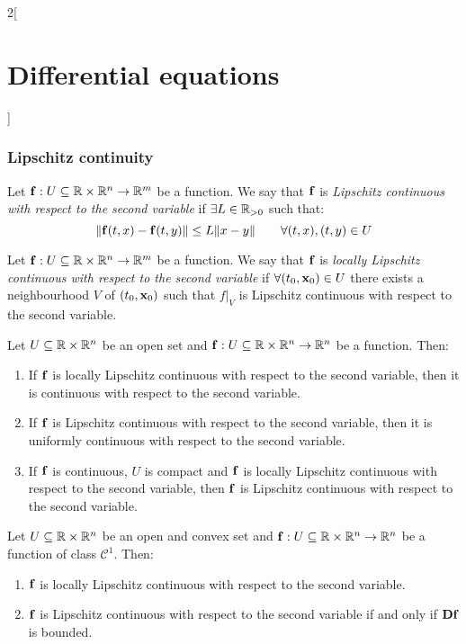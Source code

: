 \documentclass[../../../main.tex]{subfiles}
\begin{document}
\begin{multicols}{2}[\section{Differential equations}]
  \subsubsection{Lipschitz continuity}
  \begin{definition}
    Let $\boldsymbol{\mathrm{f}}:U\subseteq\mathbb{R}\times\mathbb{R}^n\rightarrow\mathbb{R}^m$ be a function. We say that $\boldsymbol{\mathrm{f}}$ is \textit{Lipschitz continuous with respect to the second variable} if $\exists L\in\mathbb{R}_{>0}$ such that: $$\|\boldsymbol{\mathrm{f}}(t,x)-\boldsymbol{\mathrm{f}}(t,y)\|\leq L\|x-y\|\qquad\forall (t,x),(t,y)\in U$$
  \end{definition}
  \begin{definition}
    Let $\boldsymbol{\mathrm{f}}:U\subseteq\mathbb{R}\times\mathbb{R}^n\rightarrow\mathbb{R}^m$ be a function. We say that $\boldsymbol{\mathrm{f}}$ is \textit{locally Lipschitz continuous with respect to the second variable} if $\forall (t_0,\boldsymbol{\mathrm{x}}_0)\in U$ there exists a neighbourhood $V$ of $(t_0,\boldsymbol{\mathrm{x}}_0)$ such that $f|_V$ is Lipschitz continuous with respect to the second variable.
  \end{definition}
  \begin{prop}
    Let $U\subseteq\mathbb{R}\times\mathbb{R}^n$ be an open set and $\boldsymbol{\mathrm{f}}:U\subseteq\mathbb{R}\times\mathbb{R}^n\rightarrow\mathbb{R}^n$ be a function. Then:
    \begin{enumerate}
      \item If $\boldsymbol{\mathrm{f}}$ is locally Lipschitz continuous with respect to the second variable, then it is continuous with respect to the second variable.
      \item If $\boldsymbol{\mathrm{f}}$ is Lipschitz continuous with respect to the second variable, then it is uniformly continuous with respect to the second variable.
      \item If $\boldsymbol{\mathrm{f}}$ is continuous, $U$ is compact and $\boldsymbol{\mathrm{f}}$ is locally Lipschitz continuous with respect to the second variable, then $\boldsymbol{\mathrm{f}}$ is Lipschitz continuous with respect to the second variable.
    \end{enumerate}
  \end{prop}
  \begin{prop}
    Let $U\subseteq\mathbb{R}\times\mathbb{R}^n$ be an open and convex set and $\boldsymbol{\mathrm{f}}:U\subseteq\mathbb{R}\times\mathbb{R}^n\rightarrow\mathbb{R}^n$ be a function of class $\mathcal{C}^1$. Then:
    \begin{enumerate}
      \item $\boldsymbol{\mathrm{f}}$ is locally Lipschitz continuous with respect to the second variable.
      \item $\boldsymbol{\mathrm{f}}$ is Lipschitz continuous with respect to the second variable if and only if $\boldsymbol{\mathrm{Df}}$ is bounded.
    \end{enumerate}
  \end{prop}

\end{multicols}
\end{document}
